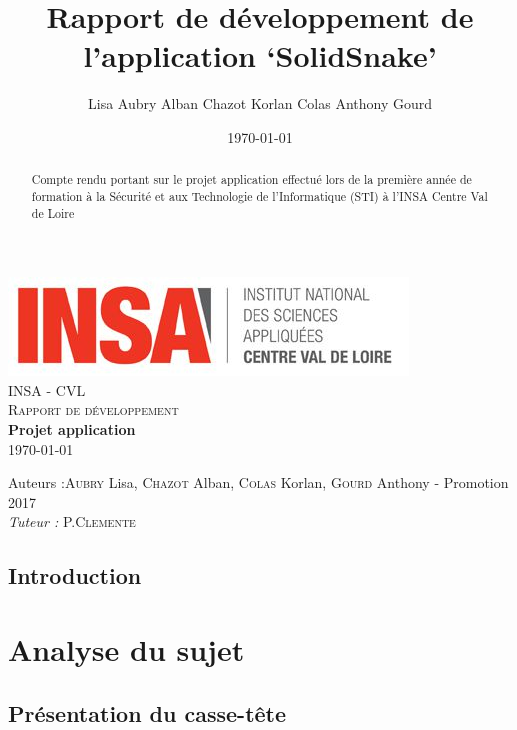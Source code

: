 \documentclass[a4paper,10pt]{report}
\title{Rapport de développement de l'application `SolidSnake'}
\author{Lisa Aubry Alban Chazot Korlan Colas Anthony Gourd}
\date{\today}
\begin{document}
\begin{titlepage}
  \begin{center}

    \includegraphics[scale=1]{img/insacvl.jpg}~\\[1.5cm]

    \textsc{\LARGE INSA - CVL}\\[2cm]

    \textsc{\Large Rapport de développement}\\[1.5cm]

    { \huge \bfseries Projet application\\[0.4cm] }
    \today
    
    \vfill

    Auteurs :\textsc{Aubry} Lisa, \textsc{Chazot} Alban, \textsc{Colas} Korlan, \textsc{Gourd} Anthony - Promotion 2017\\
    \emph{Tuteur :} P.\textsc{Clemente}\\
  \end{center}
\end{titlepage}

\begin{abstract}
Compte rendu portant sur le projet application effectué lors de la première année de formation à la Sécurité et aux Technologie de l'Informatique (STI) à l'INSA Centre Val de Loire
\end{abstract}

\tableofcontents

\chapter*{Introduction}


\part{Analyse du sujet}
\chapter{Présentation du casse-tête}

\end{document}
